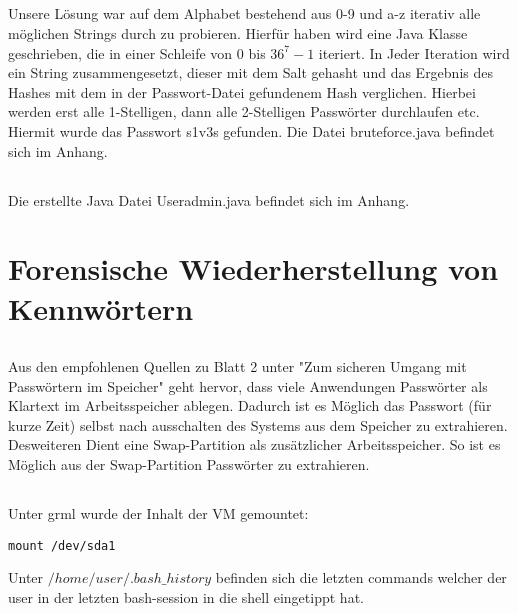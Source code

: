\documentclass[12pt]{article}
\theoremstyle{plain}
\begin{document}
\subsection{}
Unsere Lösung war auf dem Alphabet bestehend aus 0-9 und a-z iterativ alle möglichen Strings durch zu probieren. Hierfür haben wird eine Java Klasse geschrieben, die in einer Schleife von 0 bis $36^7-1$ iteriert. In Jeder Iteration wird ein String zusammengesetzt, dieser mit dem Salt gehasht und das Ergebnis des Hashes mit dem in der Passwort-Datei gefundenem Hash verglichen. Hierbei werden erst alle 1-Stelligen, dann alle 2-Stelligen Passwörter durchlaufen etc. Hiermit wurde das Passwort s1v3s gefunden. Die Datei bruteforce.java befindet sich im Anhang.
\subsection{}
Die erstellte Java Datei Useradmin.java befindet sich im Anhang.
\section{Forensische Wiederherstellung von Kennwörtern}
\subsection{}
Aus den empfohlenen Quellen zu Blatt 2 unter "Zum sicheren Umgang mit Passwörtern im Speicher" geht hervor, dass viele Anwendungen Passwörter als Klartext im Arbeitsspeicher ablegen. Dadurch ist es Möglich das Passwort (für kurze Zeit) selbst nach ausschalten des Systems aus dem Speicher zu extrahieren. Desweiteren Dient eine Swap-Partition als zusätzlicher Arbeitsspeicher. So ist es Möglich aus der Swap-Partition Passwörter zu extrahieren.
\subsection{}
Unter grml wurde der Inhalt der VM gemountet:
\begin{lstlisting} 
mount /dev/sda1
\end{lstlisting}
Unter $/home/user/.bash\_history$ befinden sich die letzten commands welcher der user in der letzten bash-session in die shell eingetippt hat.
\end{document}
